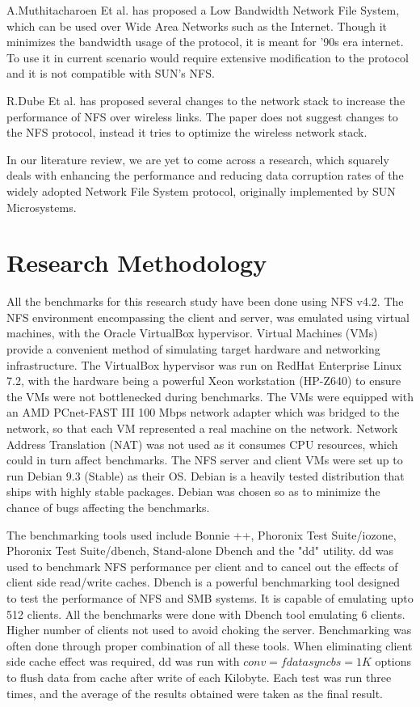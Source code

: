 \documentclass[conference]{IEEEtran}
\begin{document}
A.Muthitacharoen Et al. has proposed a Low Bandwidth Network File System\cite{b2},
which can be used over Wide Area Networks such as the Internet. Though it
minimizes the bandwidth usage of the protocol, it is meant for '90s
era internet. To use it in current scenario would require extensive 
modification to the protocol and it is not compatible with SUN's NFS.

R.Dube Et al. has proposed several changes to the network stack to increase
the performance of NFS over wireless links\cite{b3}. The paper does not suggest
changes to the NFS protocol, instead it tries to optimize the wireless
network stack.

In our literature review, we are yet to come across a research, which
squarely deals with enhancing the performance and reducing data corruption
rates of the widely adopted Network File System protocol, originally
implemented by SUN Microsystems.

\section{Research Methodology}
All the benchmarks for this research study have been done using NFS v4.2.
The NFS environment encompassing the client and server, was emulated using
virtual machines, with the Oracle VirtualBox hypervisor. Virtual Machines 
(VMs) provide a convenient method of simulating target hardware and 
networking infrastructure. The VirtualBox hypervisor was run on RedHat 
Enterprise Linux 7.2, with the hardware being a powerful Xeon workstation
(HP-Z640) to ensure the VMs were not bottlenecked during benchmarks. The VMs
were equipped with an AMD PCnet-FAST III 100 Mbps network adapter which was
bridged to the network, so that each VM represented a real machine on the 
network. Network Address Translation (NAT) was not used as it consumes CPU
resources, which could in turn affect benchmarks. The NFS server and client
VMs were set up to run Debian 9.3 (Stable) as their OS. Debian is a heavily
tested distribution that ships with highly stable packages. Debian was 
chosen so as to minimize the chance of bugs affecting the benchmarks.

The benchmarking tools used include Bonnie ++, Phoronix Test Suite/iozone,
Phoronix Test Suite/dbench, Stand-alone Dbench and the "dd" utility. dd was
used to benchmark NFS performance per client and to cancel out the effects
of client side read/write caches. Dbench is a powerful benchmarking tool
designed to test the performance of NFS and SMB systems. It is capable of
emulating upto 512 clients. All the benchmarks were done with Dbench tool
emulating 6 clients. Higher number of clients not used to avoid choking the
server. Benchmarking was often done through proper combination of all these
tools. When eliminating client side cache effect was required, dd was run
with $conv=fdatasync bs=1K$ options to flush data from cache after write of
each Kilobyte. Each test was run three times, and the average of the results
obtained were taken as the final result.
\end{document}
